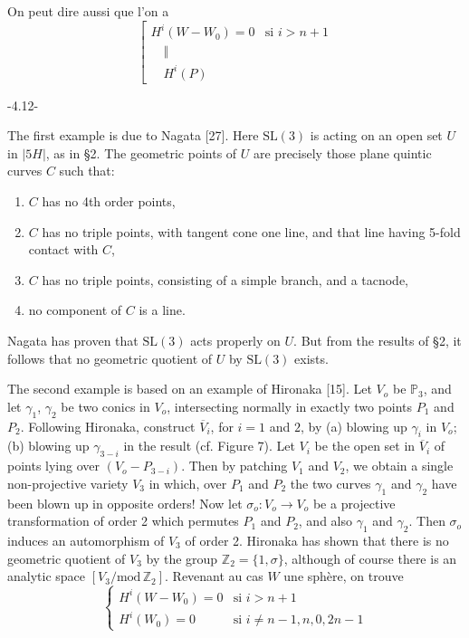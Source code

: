 On peut dire aussi que l'on a
\[\left[\begin{array}{ll}H^i(W-W_0)=0&\text{si }i>n+1\\[-.4em]\quad\Vert&\\[-.4em]\quad H^i(P)&\end{array}\right.\]
\begin{center}-4.12-\end{center}
The first example is due to Nagata [27]. Here $\mathrm{SL}(3)$ is acting on an open set $U$ in $|5H|$, as in \S2. The geometric points of $U$ are precisely those plane quintic curves $C$ such that:

\begin{enumerate}
\item[i)] $C$ has no 4th order points,
\item[ii)] $C$ has no triple points, with tangent cone one line, and that line having 5-fold contact with $C$,
\item[iii)] $C$ has no triple points, consisting of a simple branch, and a tacnode,
\item[iv)] no component of $C$ is a line.
\end{enumerate}
Nagata has proven that $\mathrm{SL}(3)$ acts properly on $U$. But from the results of \S2, it follows that no geometric quotient of $U$ by $\mathrm{SL}(3)$ exists.

The second example is based on an example of Hironaka [15]. Let $V_o$ be $\mathbb P_3$, and let $\gamma_1$, $\gamma_2$ be two conics in $V_o$, intersecting normally in exactly two points $P_1$ and $P_2$. Following Hironaka, construct $\overline V_i$, for $i=1$ and $2$, by (a) blowing up $\gamma_i$ in $V_o$; (b) blowing up $\gamma_{3-i}$ in the result (cf. Figure 7). Let $V_i$ be the open set in $\overline V_i$ of points lying over $(V_o-P_{3-i})$. Then by patching $V_1$ and $V_2$, we obtain a single non-projective variety $V_3$ in which, over $P_1$ and $P_2$ the two curves $\gamma_1$ and $\gamma_2$ have been blown up in opposite orders! Now let $\sigma_o:V_o\longrightarrow V_o$ be a projective transformation of order 2 which permutes $P_1$ and $P_2$, and also $\gamma_1$ and $\gamma_2$. Then $\sigma_o$ induces an automorphism of $V_3$ of order 2. Hironaka has shown that there is no geometric quotient of $V_3$ by the group $\mathbb Z_2=\{1,\sigma\}$, although of course there is an analytic space $[V_3/\mathrm{mod}\,\mathbb Z_2]$.
Revenant au cas $W$ une sphère, on trouve
\[\left\{\begin{array}{ll}H^i(W-W_0)=0&\text{si }i>n+1\\H^i(W_0)=0&\text{si }i\ne n-1,n,0,2n-1\end{array}\right.\]
\margin{[en fait, si $i\ne\deleted{\unsure{n,n+1}}\deleted{\unsure{]}}0,1,n,n+1$]}
\margin{(d'abord si $i\ge n+1$ et $i\ne2n-1$, puis le reste par dualité]}

